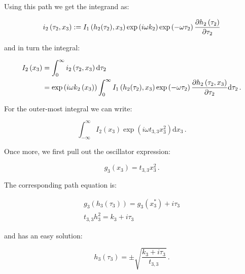 \documentclass[a4paper,10pt]{article}
\begin{document}
Using this path we get the integrand as:

\begin{equation}
 i_2\left(\tau_2, x_3\right) := I_1\left(h_2(\tau_2), x_3\right) \exp\left(i \omega k_2 \right)
                                \exp\left(- \omega \tau_2 \right) \frac{\partial h_2\left(\tau_2\right)}{\partial \tau_2}
\end{equation}

and in turn the integral:

\begin{equation}
\begin{split}
  I_2\left(x_3\right) & = \int_0^{\infty} i_2\left(\tau_2, x_3\right) \mathrm{d}\tau_2 \\
                      & = \exp\left(i \omega k_2\left(x_3\right) \right)
                          \int_0^{\infty} I_1\left(h_2(\tau_2), x_3\right)
                                          \exp\left(- \omega \tau_2 \right)
                                          \frac{\partial h_2\left(\tau_2, x_3\right)}{\partial \tau_2}
                          \mathrm{d}\tau_2 \,.
\end{split}
\end{equation}


For the outer-most integral we can write:

\begin{equation}
 \int_{-\infty}^{\infty} I_2\left(x_3\right)
                         \exp\left(i \omega t_{3,3} x_3^2\right)
 \mathrm{d}x_3 \,.
\end{equation}

Once more, we first pull out the oscillator expression:

\begin{equation}
 g_3\left(x_3\right) = t_{3,3} x_3^2 \,.
\end{equation}

The corresponding path equation is:

\begin{equation}
\begin{split}
  g_3\left(h_3\left(\tau_3\right)\right) = g_3(x_3^{*}) + i \tau_3 \\
  t_{3,3} h_3^2 = k_3 + i \tau_3
\end{split}
\end{equation}

and has an easy solution:

\begin{equation}
 h_3\left(\tau_3\right) = \pm \sqrt{\frac{k_3 + i \tau_3}{t_{3,3}}} \,.
\end{equation}
\end{document}
